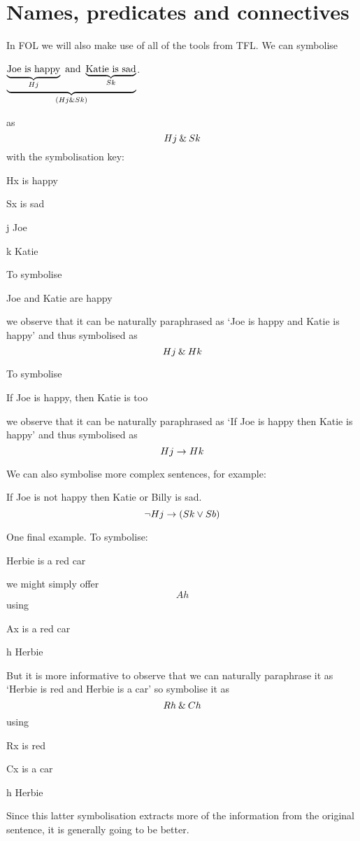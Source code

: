 \section{Names, predicates and connectives}
In FOL we will also make use of all of the tools from TFL.
We can symbolise
\begin{earg}
\item[\ex{foland}] $\underbrace{\underbrace{\text{Joe is happy}}_{Hj}\text{ and }\underbrace{\text{Katie is sad}}_{Sk}}_{(Hj\mathbin{\&} Sk)}$.
\end{earg}
as
$$Hj\mathbin{\&} Sk$$
with the symbolisation key:
\begin{ekey}
\item[Hx] is happy
\item[Sx] is sad
\item[j] Joe
\item[k] Katie
\end{ekey}

To symbolise
\begin{earg}
\item[\ex{folor}] Joe and Katie are happy
\end{earg}
we observe that it can be naturally paraphrased as
`Joe is happy and Katie is happy' and thus symbolised as $$Hj\mathbin{\&} Hk$$

To symbolise
\begin{earg}
\item[\ex{folor}] If Joe is happy, then Katie is too
\end{earg}
we observe that it can be naturally paraphrased as
`If Joe is happy then Katie is happy' and thus symbolised as $$Hj\rightarrow Hk$$

We can also symbolise more complex sentences, for example:
\begin{earg}
\item[\ex{folcomplex}] If Joe is not happy then Katie or Billy is sad.$$\neg Hj\rightarrow (Sk\vee Sb)$$
\end{earg}


One final example. To symbolise:
\begin{earg}
\item[\ex{folredcar}] Herbie is a red car
\end{earg}
we might simply offer
$$Ah$$
using
\begin{ekey}
\item[Ax] is a red car
\item[h] Herbie
\end{ekey}
But it is more informative to observe that we can naturally paraphrase it as `Herbie is red and Herbie is a car' so symbolise it as
$$Rh\mathbin{\&} Ch$$
using
\begin{ekey}
\item[Rx] is red
\item[Cx]  is a car
\item[h] Herbie
\end{ekey}
Since this latter symbolisation extracts more of the information from the original sentence, it is generally going to be better.


